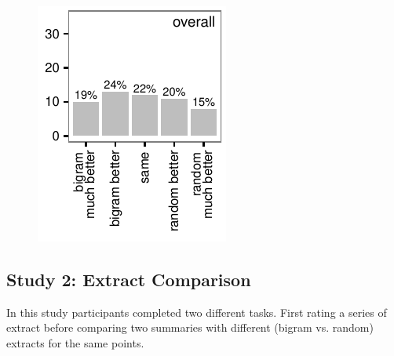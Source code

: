 \begin{figure}
\begin{minipage}{.5\textwidth}
		  \label{fig:scatter}
		\end{minipage}%
		\begin{minipage}{.25\textwidth}
		  \centering
		  \includegraphics[width=\textwidth]{graphs/bigram_vs_random_hists}
		  \label{fig:bigram_vs_random_hist}
		\end{minipage}%
	  \end{figure}

    \tocless\subsection{Study 2: Extract Comparison}
			In this study participants completed two different tasks. First rating a series of extract before comparing two summaries with different (bigram vs. random) extracts for the same points.

